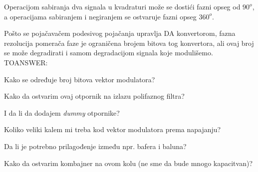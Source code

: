 \documentclass[journal,twocolumn,letterpaper]{IEEEJERM}
\begin{document}
Operacijom sabiranja dva signala u kvadraturi može se dostići fazni opseg od $90^o$, a operacijama sabiranjem i negiranjem se ostvaruje fazni opseg $360^o$.






Pošto se pojačavačem podesivog pojačanja upravlja DA konvertorom, fazna rezolucija pomerača faze je ograničena brojem bitova tog konvertora, ali ovaj broj se može degradirati i samom degradacijom signala koje modulišemo. \\

TOANSWER:

Kako se određuje broj bitova vektor modulatora?

Kako da ostvarim ovaj otpornik na izlazu polifaznog filtra?

I da li da dodajem \textit{dummy} otpornike?

Koliko veliki kalem mi treba kod vektor modulatora prema napajanju?

Da li je potrebno prilagođenje između npr. bafera i baluna?

Kako da ostvarim kombajner na ovom kolu (ne sme da bude mnogo kapacitvan)?\\



\end{document}
